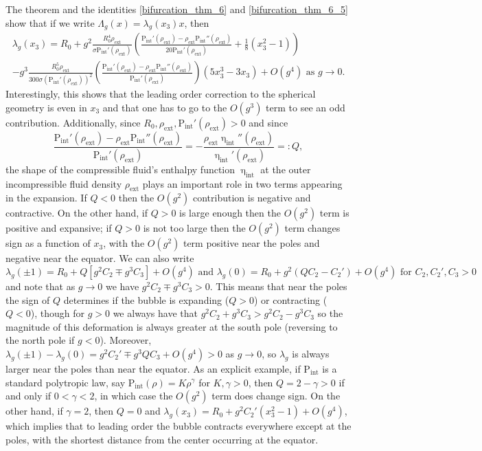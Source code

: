 \documentclass[11pt,reqno]{amsart}
\numberwithin{equation}{section}
\newcommand{\m}{\mathrm}
\def\pint{\m{P}_{\m{int}}}
\def\hint{\upeta_{\m{int}}}
\begin{document}
The theorem and the identities \eqref{bifurcation_thm_6} and \eqref{bifurcation_thm_6_5} show that if we write $\Lambda_g(x) = \lambda_g(x_3) x$, then
\begin{multline}\label{intro_expansion}
\lambda_g(x_3)  =  R_0  + g^2 \frac{R_0^4 \rho_{\m{ext}}}{\sigma \pint'(\rho_{\m{ext}})} \left( \frac{\pint'(\rho_{\m{ext}}) - \rho_{\m{ext}} \pint''(\rho_{\m{ext}})}{20 \pint'(\rho_{\m{ext}})} + \frac{1}{8}(x_3^2 - 1) \right) \\
- g^3 \frac{R_0^5 \rho_{\m{ext}}}{300\sigma (\pint'(\rho_{\m{ext}}))^2  } \left( \frac{\pint'(\rho_{\m{ext}}) - \rho_{\m{ext}} \pint''(\rho_{\m{ext}})}{\pint'(\rho_{\m{ext}})} \right) (5x_3^3 - 3 x_3)  + O(g^4) \text{ as } g\to 0.
\end{multline}
Interestingly, this shows that the leading order correction to the spherical geometry is even in $x_3$ and that one has to go to the $O(g^3)$ term to see an odd contribution.  Additionally, since $R_0, \rho_{\m{ext}}, \pint'(\rho_{\m{ext}})  >0$  and since 
\begin{equation}
\frac{\pint'(\rho_{\m{ext}}) - \rho_{\m{ext}} \pint''(\rho_{\m{ext}})}{ \pint'(\rho_{\m{ext}})} =  - \frac{\rho_{\m{ext}} \hint''(\rho_{\m{ext}})}{ \hint'(\rho_{\m{ext}})} =: Q,
\end{equation}
the shape of the compressible fluid's enthalpy function $\hint$ at the outer incompressible fluid density $\rho_{\m{ext}}$ plays an important role in two terms appearing in the expansion.  If $Q< 0$ then the $O(g^2)$ contribution is negative and contractive.  On the other hand, if $Q>0$ is large enough then the $O(g^2)$ term is positive and expansive; if $Q>0$ is not too large then the $O(g^2)$ term changes sign as a function of $x_3$, with the $O(g^2)$ term positive near the poles and negative near the equator.  We can also  write
\begin{equation}
 \lambda_g(\pm 1) = R_0 + Q[ g^2 C_2 \mp g^3 C_3] +O(g^4) \text{ and } \lambda_g(0) = R_0 + g^2(Q C_2 -C_2')  +O(g^4)\text{ for } C_2,C_2',C_3 >0
\end{equation}
and note that as $g \to 0$ we have $g^2 C_2 \mp g^3 C_3 >0$.  This means that near the poles the sign of $Q$ determines if the bubble is expanding ($Q>0$) or contracting ($Q<0$), though for $g >0$ we always have that $g^2 C_2 + g^3 C_3  > g^2 C_2 - g^3 C_3$ so the magnitude of this deformation is always greater at the south pole (reversing to the north pole if $g < 0$).  Moreover, $\lambda_g(\pm 1) - \lambda_g(0) = g^2 C_2' \mp g^3 Q C_3 +O(g^4) >0$ as $g \to 0$, so $\lambda_g$ is always larger near the poles than near the equator.  As an explicit example, if $\pint$ is a standard polytropic law, say $\pint(\rho) = K \rho^\gamma$ for $K,\gamma >0$, then $Q=2-\gamma >0$ if and only if $0 < \gamma < 2$, in which case the $O(g^2) $ term does change sign.  On the other hand, if $\gamma=2$, then $Q=0$ and $\lambda_g (x_3)= R_0 + g^2  C_2' (x_3^2-1) + O(g^4)$, which implies that to leading order the bubble contracts everywhere except at the poles, with the shortest distance from the center occurring at the equator. 
\end{document}

